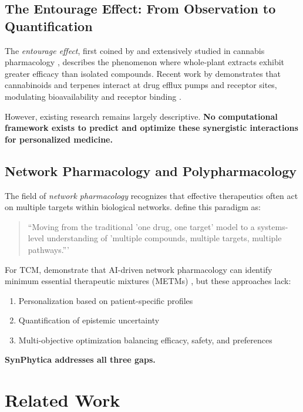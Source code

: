 \documentclass[12pt, a4paper]{article}
\begin{document}
\subsection{The Entourage Effect: From Observation to Quantification}

The \textit{entourage effect}, first coined by \citet{BenShabat1998} and extensively studied in cannabis pharmacology \citep{Russo2011, Ferber2020}, describes the phenomenon where whole-plant extracts exhibit greater efficacy than isolated compounds. Recent work by \citet{Decoding2023} demonstrates that cannabinoids and terpenes interact at drug efflux pumps and receptor sites, modulating bioavailability and receptor binding \citep{Efflux2020}.

However, existing research remains largely descriptive. \textbf{No computational framework exists to predict and optimize these synergistic interactions for personalized medicine.}

\subsection{Network Pharmacology and Polypharmacology}

The field of \textit{network pharmacology} \citep{Hopkins2008, Zhang2024} recognizes that effective therapeutics often act on multiple targets within biological networks. \citet{NetworkPharm2024} define this paradigm as:

\begin{quote}
``Moving from the traditional 'one drug, one target' model to a systems-level understanding of 'multiple compounds, multiple targets, multiple pathways.'''
\end{quote}

For TCM, \citet{Zhou2024} demonstrate that AI-driven network pharmacology can identify minimum essential therapeutic mixtures (METMs) \citep{METM2023}, but these approaches lack:
\begin{enumerate}
    \item Personalization based on patient-specific profiles
    \item Quantification of epistemic uncertainty
    \item Multi-objective optimization balancing efficacy, safety, and preferences
\end{enumerate}

\textbf{SynPhytica addresses all three gaps.}

\section{Related Work}
\end{document}

